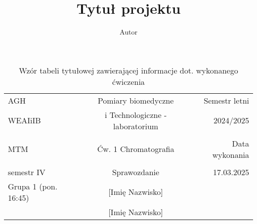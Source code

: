 \documentclass[oneside]{mwbk}  %
\title{Tytuł projektu}
\author{Autor}
\begin{document}
\pagestyle{plain}




\begin{table}[h]
\centering
\caption{Wzór tabeli tytułowej zawierającej informacje dot. wykonanego ćwiczenia}  
\label{tab:Tabela tytułowa}
\begin{tabular}{lcr}
\hline
AGH                  &  Pomiary biomedyczne                 & Semestr letni  \\
WEAIiIB              &  i Technologiczne - laboratorium     &  2024/2025  \\

 & & \\    %
 
MTM                  & Ćw. 1 Chromatografia                 & Data wykonania  \\ 

 & & \\    %
 
semestr IV           & Sprawozdanie                         & 17.03.2025  \\ 
Grupa 1 (pon. 16:45) & [Imię Nazwisko]                      &   \\ 
                     & [Imię Nazwisko]                      &   \\ 
\hline
\end{tabular}
\end{table}

\end{document}
